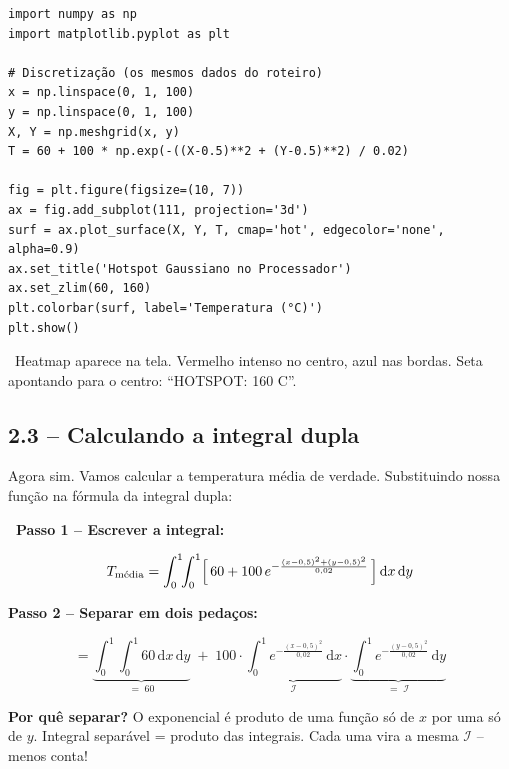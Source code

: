 
\begin{lstlisting}[caption={Mapa de calor com Matplotlib}]
import numpy as np
import matplotlib.pyplot as plt

# Discretização (os mesmos dados do roteiro)
x = np.linspace(0, 1, 100)
y = np.linspace(0, 1, 100)
X, Y = np.meshgrid(x, y)
T = 60 + 100 * np.exp(-((X-0.5)**2 + (Y-0.5)**2) / 0.02)

fig = plt.figure(figsize=(10, 7))
ax = fig.add_subplot(111, projection='3d')
surf = ax.plot_surface(X, Y, T, cmap='hot', edgecolor='none', alpha=0.9)
ax.set_title('Hotspot Gaussiano no Processador')
ax.set_zlim(60, 160)
plt.colorbar(surf, label='Temperatura (°C)')
plt.show()
\end{lstlisting}

\begin{visual}
\faFilm\ Heatmap aparece na tela. Vermelho intenso no centro, azul nas bordas.
Seta apontando para o centro: ``HOTSPOT: 160 {\textdegree}C''.
\end{visual}

\subsection{2.3 -- Calculando a integral dupla}

\begin{fala}
Agora sim. Vamos calcular a temperatura média de verdade.
Substituindo nossa função na fórmula da integral dupla:
\end{fala}

\begin{mathblock}
\textbf{\color{corMath}\faSuperscript\ Passo 1 -- Escrever a integral:}

\[
  T_{\text{média}}
  = \int_0^1\!\!\int_0^1
    \Bigl[\,60 + 100\,e^{-\frac{(x-0{,}5)^2+(y-0{,}5)^2}{0{,}02}}\,\Bigr]
    \,\mathrm{d}x\,\mathrm{d}y
\]

\textbf{\color{corMath}Passo 2 -- Separar em dois pedaços:}

\[
  = \underbrace{\int_0^1\!\!\int_0^1 60\,\mathrm{d}x\,\mathrm{d}y}_{=\;60}
  \;+\;
  100
  \cdot
  \underbrace{\int_0^1 e^{-\frac{(x-0{,}5)^2}{0{,}02}}\,\mathrm{d}x}_{\mathcal{I}}
  \cdot
  \underbrace{\int_0^1 e^{-\frac{(y-0{,}5)^2}{0{,}02}}\,\mathrm{d}y}_{=\;\mathcal{I}}
\]

{\small\color{gray}\textbf{Por quê separar?} O exponencial é produto de uma função só
de $x$ por uma só de $y$. Integral separável = produto das integrais. Cada uma vira
a mesma $\mathcal{I}$ -- menos conta!}
\end{mathblock}

